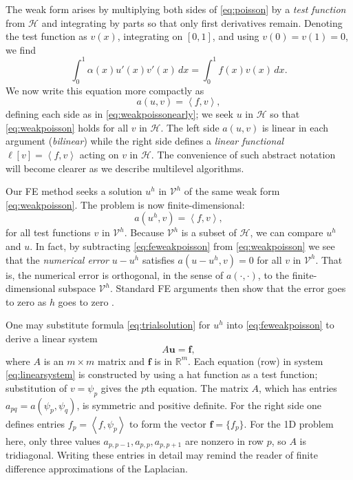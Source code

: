 \documentclass[letterpaper,final,12pt,reqno]{amsart}
\theoremstyle{claim}
\newcommand{\RR}{\mathbb{R}}
\newcommand{\bbf}{\mathbf{f}}
\newcommand{\bu}{\mathbf{u}}
\newcommand{\ip}[2]{\left<#1,#2\right>}
\numberwithin{equation}{section}
\numberwithin{figure}{section}
\numberwithin{table}{section}
\numberwithin{theorem}{section}
\begin{document}
The weak form arises by multiplying both sides of \eqref{eq:poisson} by a \emph{test function} from $\mathcal{H}$ and integrating by parts so that only first derivatives remain.  Denoting the test function as $v(x)$, integrating on $[0,1]$, and using $v(0)=v(1)=0$, we find
\begin{equation}
\int_0^1 \alpha(x) u'(x) v'(x)\,dx = \int_0^1 f(x) v(x)\, dx.  \label{eq:weakpoissonearly}
\end{equation}
We now write this equation more compactly as
\begin{equation}
  a(u,v) = \ip{f}{v}, \label{eq:weakpoisson}
\end{equation}
defining each side as in \eqref{eq:weakpoissonearly}; we seek $u$ in $\mathcal{H}$ so that \eqref{eq:weakpoisson} holds for all $v$ in $\mathcal{H}$.  The left side $a(u,v)$ is linear in each argument (\emph{bilinear}) while the right side defines a \emph{linear functional} $\ell[v] = \ip{f}{v}$ acting on $v$ in $\mathcal{H}$.  The convenience of such abstract notation will become clearer as we describe multilevel algorithms.

Our FE method seeks a solution $u^h$ in $\mathcal{V}^h$ of the same weak form \eqref{eq:weakpoisson}.  The problem is now finite-dimensional:
\begin{equation}
  a(u^h,v) = \ip{f}{v},  \label{eq:feweakpoisson}
\end{equation}
for all test functions $v$ in $\mathcal{V}^h$.  Because $\mathcal{V}^h$ is a subset of $\mathcal{H}$, we can compare $u^h$ and $u$.  In fact, by subtracting \eqref{eq:feweakpoisson} from \eqref{eq:weakpoisson} we see that the \emph{numerical error} $u-u^h$ satisfies $a(u-u^h,v)=0$ for all $v$ in $\mathcal{V}^h$.  That is, the numerical error is orthogonal, in the sense of $a(\cdot,\cdot)$, to the finite-dimensional subspace $\mathcal{V}^h$.  Standard FE arguments then show that the error goes to zero as $h$ goes to zero \cite{Braess2007,Elmanetal2014}.

One may substitute formula \eqref{eq:trialsolution} for $u^h$ into \eqref{eq:feweakpoisson} to derive a linear system
\begin{equation}
A \bu = \bbf, \label{eq:linearsystem}
\end{equation}
where $A$ is an $m\times m$ matrix and $\bbf$ is in $\RR^m$.  Each equation (row) in system \eqref{eq:linearsystem} is constructed by using a hat function as a test function; substitution of $v=\psi_p$ gives the $p$th equation.  The matrix $A$, which has entries $a_{pq} = a(\psi_p,\psi_q)$, is symmetric and positive definite.  For the right side one defines entries $f_p = \ip{f}{\psi_p}$ to form the vector $\bbf = \{f_p\}$.  For the 1D problem here, only three values $a_{p,p-1}, a_{p,p}, a_{p,p+1}$ are nonzero in row $p$, so $A$ is tridiagonal.  Writing these entries in detail may remind the reader of finite difference approximations of the Laplacian.
\end{document}
